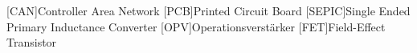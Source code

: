 
\begin{acronym}[ACRONYM]
[CAN]{Controller Area Network}
[PCB]{Printed Circuit Board}
[SEPIC]{Single Ended Primary Inductance Converter}
[OPV]{Operationsverstärker}
[FET]{Field-Effect Transistor}
\end{acronym}\newpage

